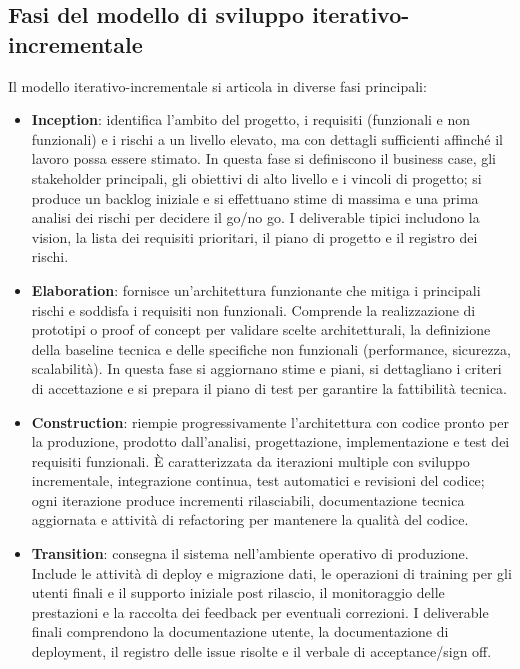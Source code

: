 \subsection{Fasi del modello di sviluppo iterativo-incrementale}
Il modello iterativo-incrementale si articola in diverse fasi principali:
\begin{itemize}
\item \textbf {Inception}: identifica l'ambito del progetto, i requisiti (funzionali e non funzionali) e i rischi a un livello elevato, ma con dettagli sufficienti affinché il lavoro possa essere stimato. In questa fase si definiscono il business case, gli stakeholder principali, gli obiettivi di alto livello e i vincoli di progetto; si produce un backlog iniziale e si effettuano stime di massima e una prima analisi dei rischi per decidere il go/no go. I deliverable tipici includono la vision, la lista dei requisiti prioritari, il piano di progetto e il registro dei rischi.
\item \textbf {Elaboration}: fornisce un'architettura funzionante che mitiga i principali rischi e soddisfa i requisiti non funzionali. Comprende la realizzazione di prototipi o proof of concept per validare scelte architetturali, la definizione della baseline tecnica e delle specifiche non funzionali (performance, sicurezza, scalabilità). In questa fase si aggiornano stime e piani, si dettagliano i criteri di accettazione e si prepara il piano di test per garantire la fattibilità tecnica.
\item \textbf {Construction}: riempie progressivamente l'architettura con codice pronto per la produzione, prodotto dall'analisi, progettazione, implementazione e test dei requisiti funzionali. È caratterizzata da iterazioni multiple con sviluppo incrementale, integrazione continua, test automatici e revisioni del codice; ogni iterazione produce incrementi rilasciabili, documentazione tecnica aggiornata e attività di refactoring per mantenere la qualità del codice.
\item \textbf {Transition}: consegna il sistema nell'ambiente operativo di produzione. Include le attività di deploy e migrazione dati, le operazioni di training per gli utenti finali e il supporto iniziale post rilascio, il monitoraggio delle prestazioni e la raccolta dei feedback per eventuali correzioni. I deliverable finali comprendono la documentazione utente, la documentazione di deployment, il registro delle issue risolte e il verbale di acceptance/sign off.
\end{itemize}

